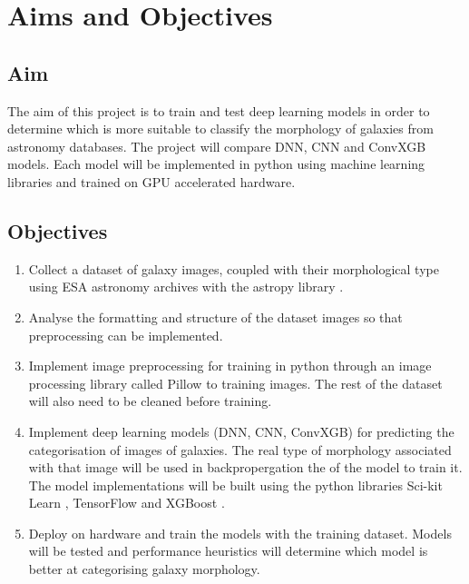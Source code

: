 \documentclass[12pt,runningheads]{llncs}
\begin{document}
\section{Aims and Objectives}

\subsection{Aim}
The aim of this project is to train and test deep learning models in order to
determine which is more suitable to classify the morphology of galaxies from
astronomy databases. The project will compare DNN, CNN and ConvXGB models.
Each model will be implemented in python using machine learning libraries and
trained on GPU accelerated hardware.

\subsection{Objectives}

\begin{enumerate}
    \item Collect a dataset of galaxy images, coupled with their morphological
    type using ESA astronomy archives \cite{ESAHSA} with the astropy library
    \cite{ASTROPY}.

    \item Analyse the formatting and structure of the dataset images so that
    preprocessing can be implemented.

    \item Implement image preprocessing for training in python through an image
    processing library called Pillow \cite{PIL} to training images. The rest of
    the dataset will also need to be cleaned before training.

    \item Implement deep learning models (DNN, CNN, ConvXGB) for predicting the
    categorisation of images of galaxies. The real type of morphology
    associated with that image will be used in backpropergation the of the model
    to train it. The model implementations will be built using the python
    libraries Sci-kit Learn \cite{SCIKIT}, TensorFlow \cite{TFLOW} and XGBoost
    \cite{XGB}.

    \item Deploy on hardware and train the models with the training dataset.
    Models will be tested and performance heuristics will determine which model
    is better at categorising galaxy morphology.
\end{enumerate}
\end{document}
